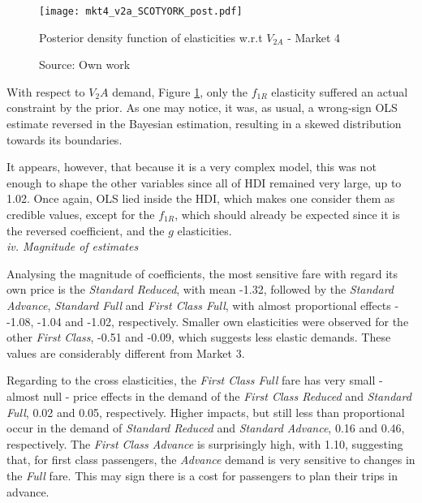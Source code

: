 \begin{figure}[H]
\centering
\texttt{[image: mkt4\_v2a\_SCOTYORK\_post.pdf]}
\caption{Posterior density function of elasticities w.r.t $V_{2A}$ - Market 4}
\label{fig:mkt4_v2a_SCOTYORK_post}
\caption*{Source: Own work}
\end{figure} 

With respect to $V_2A$ demand, Figure \ref{fig:mkt4_v2a_SCOTYORK_post}, only the $f_{1R}$ elasticity suffered an actual constraint by the prior. As one may notice, it was, as usual, a wrong-sign OLS estimate reversed in the Bayesian estimation, resulting in a skewed distribution towards its boundaries. 

It appears, however, that because it is a very complex model, this was not enough to shape the other variables since all of HDI remained very large, up to 1.02. Once again, OLS lied inside the HDI, which makes one consider them as credible values, except for the $f_{1R}$, which should already be expected since it is the reversed coefficient, and the $g$ elasticities.
\\[3pt]

\textit{iv. Magnitude of estimates}


Analysing the magnitude of coefficients, the most sensitive fare with regard its own price is the \textit{Standard Reduced}, with mean -1.32, followed by the \textit{Standard Advance}, \textit{Standard Full} and \textit{First Class Full}, with almost proportional effects - -1.08, -1.04 and -1.02, respectively. Smaller own elasticities were observed for the other \textit{First Class}, -0.51 and -0.09, which suggests less elastic demands. These values are considerably different from Market 3.

Regarding to the cross elasticities, the \textit{First Class Full} fare has very small - almost null - price effects in the demand of the \textit{First Class Reduced} and \textit{Standard Full}, 0.02 and 0.05, respectively. Higher impacts, but still less than proportional occur in the demand of \textit{Standard Reduced} and \textit{Standard Advance}, 0.16 and 0.46, respectively. The \textit{First Class Advance} is surprisingly high, with 1.10, suggesting that, for first class passengers, the \textit{Advance} demand is very sensitive to changes in the \textit{Full} fare. This may sign there is a cost for passengers to plan their trips in advance.

